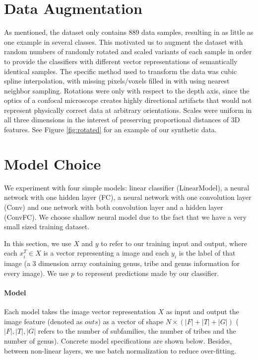\documentclass{article}
\begin{document}
\section{Data Augmentation}

As mentioned, the dataset only contains 889 data samples, resulting in as little as one example in several classes. This motivated us to augment the dataset with random numbers of randomly rotated and scaled variants of each sample in order to provide the classifiers with different vector representations of semantically identical samples. The specific method used to transform the data was cubic spline interpolation, with missing pixels/voxels filled in with using nearest neighbor sampling. Rotations were only with respect to the depth axis, since the optics of a confocal microscope creates highly directional artifacts that would not represent physically correct data at arbitrary orientations. Scales were uniform in all three dimensions in the interest of preserving proportional distances of 3D features. See Figure \ref{fig:rotated} for an example of our synthetic data.


\section{Model Choice}

We experiment with four simple models: linear classifier (LinearModel), a neural network with one hidden layer (FC), a neural network with one convolution layer (Conv) and one network with both convolution layer and a hidden layer (ConvFC). We choose shallow neural model due to the fact that we have a very small sized training dataset.

In this section, we use ${X}$ and ${y}$ to refer to our training input and output, where each ${x}_i^T\in {X}$ is a vector representing a image and each ${y_i}$ is the label of that image (a 3 dimension array containing genus, tribe and genus information for every image). We use ${p}$ to represent predictions made by our classifier. 


\paragraph{Model}

Each model takes the image vector representation $X$ as input and output the image feature (denoted as $\mathit{outs}$) as a vector of shape $N\times (|F| + |T| + |G|)$ ($|F|, |T|, |G|$ refers to the number of subfamilies, the number of tribes and the number of genus). Concrete model specifications are shown below. Besides, between non-linear layers, we use batch normalization to reduce over-fitting.
\end{document}
